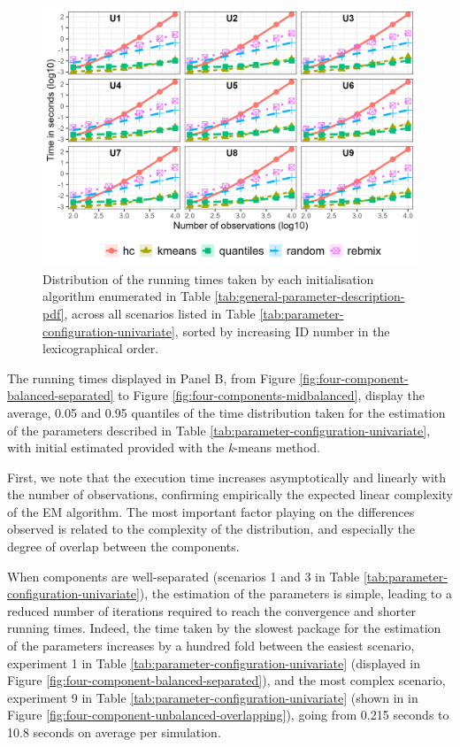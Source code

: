 \begin{figure}

{\centering \includegraphics[width=1\linewidth]{./figs/univariate_initialisation_time_computations} 

}

\caption{Distribution of the running times taken by each initialisation algorithm enumerated in Table \ref{tab:general-parameter-description-pdf}, across all scenarios listed in Table \ref{tab:parameter-configuration-univariate}, sorted by increasing ID number in the lexicographical order.}\label{fig:univariate-initialisation-time-computations}
\end{figure}

The running times displayed in Panel B, from Figure
\ref{fig:four-component-balanced-separated} to Figure
\ref{fig:four-components-midbalanced}, display the average, 0.05 and 0.95 quantiles of the time distribution
taken for the estimation of the parameters described in Table
\ref{tab:parameter-configuration-univariate}, with initial
estimated provided with the \emph{k}-means method.

First, we note that the execution time increases asymptotically and
linearly with the number of observations, confirming empirically the
expected linear complexity of the EM algorithm. The most important
factor playing on the differences observed is related to the complexity
of the distribution, and especially the degree of overlap between the
components.

When components are well-separated (scenarios 1 and 3 in Table \ref{tab:parameter-configuration-univariate}), the estimation of
the parameters is simple, leading to a reduced number of iterations
required to reach the convergence and shorter running times. Indeed, the
time taken by the slowest package for the estimation of the parameters
increases by a hundred fold between the easiest scenario, experiment 1
in Table \ref{tab:parameter-configuration-univariate} (displayed in
Figure \ref{fig:four-component-balanced-separated}), and the most
complex scenario, experiment 9 in Table
\ref{tab:parameter-configuration-univariate} (shown in in Figure
\ref{fig:four-component-unbalanced-overlapping}), going from 0.215
seconds to 10.8 seconds on average per simulation.

